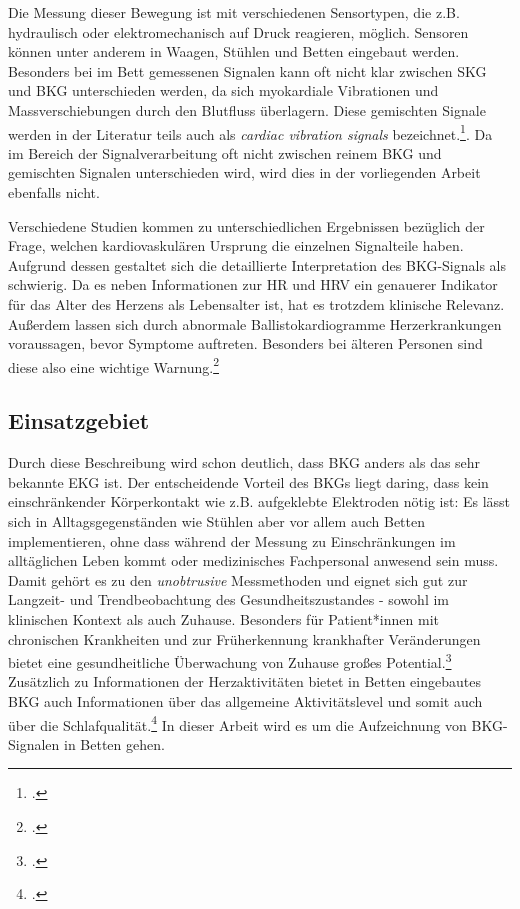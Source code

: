 	Die Messung dieser Bewegung ist mit verschiedenen Sensortypen, die z.B. hydraulisch oder elektromechanisch auf Druck reagieren, möglich. Sensoren können unter anderem in Waagen, Stühlen und Betten eingebaut werden. Besonders bei im Bett gemessenen Signalen kann oft nicht klar zwischen \ac{SKG} und \ac{BKG} unterschieden werden, da sich myokardiale Vibrationen und Massverschiebungen durch den Blutfluss überlagern. Diese gemischten Signale werden in der Literatur teils auch als \textit{cardiac vibration signals} bezeichnet.\footcite[Vgl.][]{Bruser2013}. Da im Bereich der Signalverarbeitung oft nicht zwischen reinem \ac{BKG} und gemischten Signalen unterschieden wird, wird dies in der vorliegenden Arbeit ebenfalls nicht.
	
	Verschiedene Studien kommen zu unterschiedlichen Ergebnissen bezüglich der Frage, welchen kardiovaskulären Ursprung die einzelnen Signalteile haben. Aufgrund dessen gestaltet sich die detaillierte Interpretation des \ac{BKG}-Signals als schwierig. Da es neben Informationen zur \ac{HR} und \ac{HRV} ein genauerer Indikator für das Alter des Herzens als Lebensalter ist, hat es trotzdem klinische Relevanz. Außerdem lassen sich durch abnormale Ballistokardiogramme Herzerkrankungen voraussagen, bevor Symptome auftreten. Besonders bei älteren Personen sind diese also eine wichtige Warnung.\footcite[Vgl. zu diesem Absatz][]{Pinheiro2010}
	
	\subsection{Einsatzgebiet}
	
	Durch diese Beschreibung wird schon deutlich, dass \ac{BKG} anders als das sehr bekannte \ac{EKG} ist. Der entscheidende Vorteil des \ac{BKG}s liegt daring, dass kein einschränkender Körperkontakt wie z.B. aufgeklebte Elektroden nötig ist: Es lässt sich in Alltagsgegenständen wie Stühlen aber vor allem auch Betten implementieren, ohne dass während der Messung zu Einschränkungen im alltäglichen Leben kommt oder medizinisches Fachpersonal anwesend sein muss. Damit gehört es zu den \textit{unobtrusive} Messmethoden und eignet sich gut zur Langzeit- und Trendbeobachtung des Gesundheitszustandes - sowohl im klinischen Kontext als auch Zuhause. Besonders für Patient*innen mit chronischen Krankheiten und zur Früherkennung krankhafter Veränderungen bietet eine gesundheitliche Überwachung von Zuhause großes Potential.\footcite[Vgl.][]{Inan2015} Zusätzlich zu Informationen der Herzaktivitäten bietet in Betten eingebautes \ac{BKG} auch Informationen über das allgemeine Aktivitätslevel und somit auch über die Schlafqualität.\footcite[Vgl.][]{Bruser2011} In dieser Arbeit wird es um die Aufzeichnung von \ac{BKG}-Signalen in Betten gehen.
	
